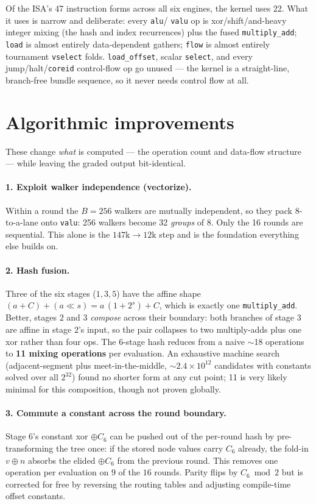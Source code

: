 \documentclass[11pt]{article}
\newcommand{\code}[1]{\texttt{#1}}
\begin{document}
\noindent Of the ISA's 47 instruction forms across all six engines, the
kernel uses 22. What it uses is narrow and deliberate: every \code{alu}/
\code{valu} op is xor/shift/and-heavy integer mixing (the hash and index
recurrences) plus the fused \code{multiply\_add}; \code{load} is almost
entirely data-dependent gathers; \code{flow} is almost entirely tournament
\code{vselect} folds. \code{load\_offset}, scalar \code{select}, and every
jump/halt/\code{coreid} control-flow op go unused --- the kernel is a
straight-line, branch-free bundle sequence, so it never needs control flow
at all.

\section{Algorithmic improvements}

These change \emph{what} is computed --- the operation count and data-flow
structure --- while leaving the graded output bit-identical.

\paragraph{1. Exploit walker independence (vectorize).} Within a round the
$B=256$ walkers are mutually independent, so they pack 8-to-a-lane onto
\code{valu}: 256 walkers become 32 \emph{groups} of 8. Only the 16 rounds are
sequential. This alone is the $147\text{k}\!\to\!12\text{k}$ step and is the
foundation everything else builds on.

\paragraph{2. Hash fusion.} Three of the six stages ($1,3,5$) have the affine
shape $(a+C)+(a\ll s) = a\,(1+2^s)+C$, which is exactly one
\code{multiply\_add}. Better, stages $2$ and $3$ \emph{compose} across their
boundary: both branches of stage $3$ are affine in stage $2$'s input, so the
pair collapses to two multiply-adds plus one xor rather than four ops. The
6-stage hash reduces from a naive $\sim$18 operations to \textbf{11 mixing
operations} per evaluation. An exhaustive machine search (adjacent-segment
plus meet-in-the-middle, ${\sim}2.4\times10^{12}$ candidates with constants
solved over all $2^{32}$) found no shorter form at any cut point; 11 is very
likely minimal for this composition, though not proven globally.

\paragraph{3. Commute a constant across the round boundary.} Stage 6's
constant xor $\oplus C_6$ can be pushed out of the per-round hash by
pre-transforming the tree once: if the stored node values carry $C_6$
already, the fold-in $v \oplus n$ absorbs the elided $\oplus C_6$ from the
previous round. This removes one operation per evaluation on $9$ of the $16$
rounds. Parity flips by $C_6\bmod 2$ but is corrected for free by reversing
the routing tables and adjusting compile-time offset constants.
\end{document}
